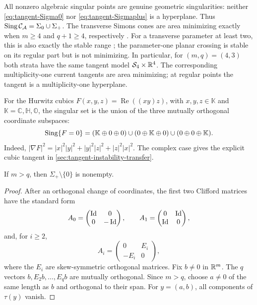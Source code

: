 \begin{remark}
All nonzero algebraic singular points are genuine geometric
singularities: neither
\eqref{eq:tangent-Sigma0} nor \eqref{eq:tangent-Sigmaplus} is a
hyperplane. Thus \(\operatorname{Sing}\mathcal C_\mathcal A=\Sigma_0\cup\Sigma_+\).
The transverse Simons cones are area minimizing exactly when
$m\geq4$ and $q+1\geq4$, respectively
\cite{BDGG69,DePhilippisPaolini}. For a transverse parameter at least
two, this is also exactly the stable range \cite[Section~6.1]{Simons68}; the parameter-one planar
crossing is stable on its regular part but is not minimizing. In particular,
for $(m,q)=(4,3)$ both strata have the same tangent model
$\mathcal S_4\times\mathbb R^4$.  The corresponding multiplicity-one current tangents are area minimizing;
at regular points the tangent is a multiplicity-one hyperplane.

For the Hurwitz cubics \(F(x,y,z)=\operatorname{Re}((xy)z)\), with
\(x,y,z\in\mathbb K\) and \(\mathbb K=\mathbb C,\mathbb H,\mathbb O\),
the singular set is the union of the three mutually orthogonal
coordinate subspaces:
\[
 \operatorname{Sing}\{F=0\}
 =(\mathbb K\oplus0\oplus0)\cup(0\oplus\mathbb K\oplus0)
   \cup(0\oplus0\oplus\mathbb K).
\]
Indeed, \(|\nabla F|^2=|x|^2|y|^2+|y|^2|z|^2+|z|^2|x|^2\).
The complex case gives the explicit cubic tangent in
\cref{sec:tangent-instability-transfer}.
\end{remark}

\begin{lemma}
\label{lem:Sigmaplus-nonempty}
If $m>q$, then $\Sigma_+\setminus\{0\}$ is nonempty.
\end{lemma}

\begin{proof}
After an orthogonal change of coordinates, the first two Clifford
matrices have the standard form
\begin{equation}\label{eq:standard-first-two}
 A_0=
 \begin{pmatrix}\operatorname{Id}&0\\0&-\operatorname{Id}\end{pmatrix},
 \qquad
 A_1=
 \begin{pmatrix}0&\operatorname{Id}\\\operatorname{Id}&0\end{pmatrix},
\end{equation}
and, for $i\geq2$,
\begin{equation}\label{eq:standard-rest}
 A_i=
 \begin{pmatrix}0&E_i\\-E_i&0\end{pmatrix},
\end{equation}
where the $E_i$ are skew-symmetric orthogonal matrices.  Fix
$b\neq0$ in $\mathbb R^m$.  The $q$ vectors
$b,E_2b,\ldots,E_qb$ are mutually orthogonal.  Since $m>q$, choose
$a\neq0$ of the same length as $b$ and orthogonal to their span.
For $y=(a,b)$, all components of $\tau(y)$ vanish.
\end{proof}

